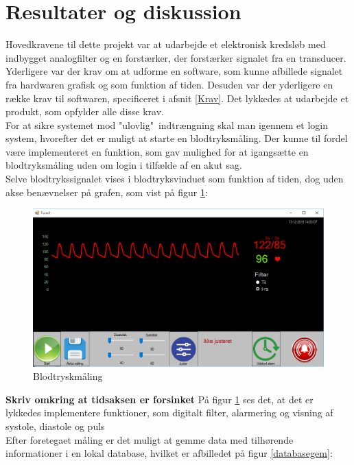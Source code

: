 \section{Resultater og diskussion}
Hovedkravene til dette projekt var at udarbejde et elektronisk kredsløb med indbygget analogfilter og en forstærker, der forstærker signalet fra en transducer. Yderligere var der krav om at udforme en software, som kunne afbillede signalet fra hardwaren grafisk og som funktion af tiden. Desuden var der yderligere en række krav til softwaren, specificeret i afsnit \ref{Krav}. Det lykkedes at udarbejde et produkt, som opfylder alle disse krav. \\[1ex]

For at sikre systemet mod "ulovlig"\ indtrængning skal man igennem et login system, hvorefter det er muligt at starte en blodtryksmåling. Der kunne til fordel være implementeret en funktion, som gav mulighed for at igangsætte en blodtryksmåling uden om login i tilfælde af en akut sag.\\ 
Selve blodtrykssignalet vises i blodtryksvinduet som funktion af tiden, dog uden akse benævnelser på grafen, som vist på figur \ref{blodtryk}:

\begin{figure}[H]
	\centering
	\includegraphics[width=1\textwidth]{Figurer/SoftwareImplementering/blodtryk}
	\caption{Blodtryskmåling}
	\label{blodtryk}
\end{figure}

\textbf{Skriv omkring at tidsaksen er forsinket}
På figur \ref{blodtryk} ses det, at det er lykkedes implementere funktioner, som digitalt filter, alarmering og visning af systole, diastole og puls\\
Efter foretegaet måling er det muligt at gemme data med tilhørende informationer i en lokal database, hvilket er afbilledet på figur \ref{databasegem}:

